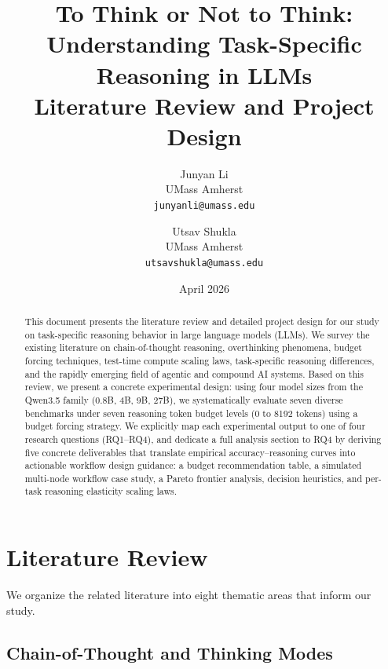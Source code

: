 \documentclass[11pt]{article}
\title{\textbf{To Think or Not to Think: Understanding Task-Specific Reasoning in LLMs} \\ \vspace{0.3em} \large Literature Review and Project Design}
\author{
    Junyan Li \\
    UMass Amherst \\
    \texttt{junyanli@umass.edu}
    \and
    Utsav Shukla \\
    UMass Amherst \\
    \texttt{utsavshukla@umass.edu}
}
\date{April 2026}
\begin{document}
\maketitle

\begin{abstract}
This document presents the literature review and detailed project design for our study on task-specific reasoning behavior in large language models (LLMs). We survey the existing literature on chain-of-thought reasoning, overthinking phenomena, budget forcing techniques, test-time compute scaling laws, task-specific reasoning differences, and the rapidly emerging field of agentic and compound AI systems. Based on this review, we present a concrete experimental design: using four model sizes from the Qwen3.5 family (0.8B, 4B, 9B, 27B), we systematically evaluate seven diverse benchmarks under seven reasoning token budget levels (0 to 8192 tokens) using a budget forcing strategy. We explicitly map each experimental output to one of four research questions (RQ1--RQ4), and dedicate a full analysis section to RQ4 by deriving five concrete deliverables that translate empirical accuracy--reasoning curves into actionable workflow design guidance: a budget recommendation table, a simulated multi-node workflow case study, a Pareto frontier analysis, decision heuristics, and per-task reasoning elasticity scaling laws.
\end{abstract}

\section{Literature Review}

We organize the related literature into eight thematic areas that inform our study.

\subsection{Chain-of-Thought and Thinking Modes}
\end{document}
